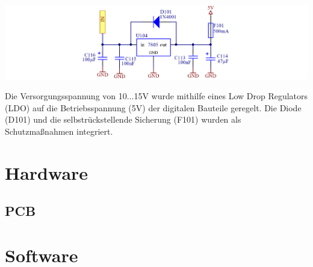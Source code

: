 \documentclass[paper=a4, 12pt]{scrreprt}
\begin{document}
	\begin{adjustbox}{center,caption={VoltageRegulator 7805 },label={fig:VoltageRegulator.PNG},nofloat=figure,vspace=\bigskipamount}
		\includegraphics[width=\textwidth]{img/VoltageRegulator.PNG}
	\end{adjustbox}
 	Die Versorgungsspannung von 10...15V wurde mithilfe eines Low Drop Regulators (LDO) auf die Betriebsspannung (5V) der digitalen Bauteile geregelt. Die Diode (D101) und die selbstrückstellende Sicherung (F101) wurden als Schutzmaßnahmen integriert.
	\newpage
	
	\section{Hardware}\hfill \break
		\subsection{PCB}\hfill \break
	\newpage
	
	\section{Software}\hfill \break
\end{document}
